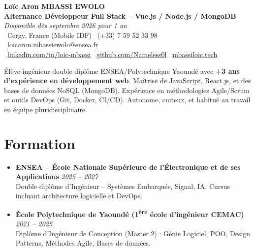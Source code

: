 \documentclass[a4paper,11pt]{article}
\begin{document}
\begin{center}
    {\Large \textbf{Loïc Aron MBASSI EWOLO}} \\ \vspace{4pt}
    \textbf{\large Alternance Développeur Full Stack -- Vue.js / Node.js / MongoDB} \\
    \textit{\small Disponible dès septembre 2026 pour 1 an} \\ \vspace{4pt}
    \small
    \faMapMarker\ Cergy, France (Mobile IDF) \quad
    \faPhone\ (+33) 7 59 52 33 98 \quad
    \faEnvelope\ \href{mailto:loicaron.mbassiewolo@ensea.fr}{loicaron.mbassiewolo@ensea.fr} \\ \vspace{2pt}
    \faLinkedin\ \href{https://www.linkedin.com/in/loic-mbassi/}{linkedin.com/in/loic-mbassi} \quad
    \faGithub\ \href{https://github.com/Nameless0l}{github.com/Nameless0l} \quad
    \faGlobe\ \href{https://mbassiloic.tech}{mbassiloic.tech}
\end{center}

\vspace{-6pt}

\noindent\small{Élève-ingénieur double diplôme ENSEA/Polytechnique Yaoundé avec \textbf{+3 ans d'expérience en développement web}. Maîtrise de JavaScript, React.js, et des bases de données NoSQL (MongoDB). Expérience en méthodologies Agile/Scrum et outils DevOps (Git, Docker, CI/CD). Autonome, curieux, et habitué au travail en équipe pluridisciplinaire.}

\section{Formation}
\begin{itemize}[leftmargin=*, label=\tiny$\bullet$, nosep]
    \item \textbf{ENSEA -- École Nationale Supérieure de l'Électronique et de ses Applications} \hfill \textit{2025 -- 2027} \\
    \small{Double diplôme d'Ingénieur -- Systèmes Embarqués, Signal, IA. Cursus incluant architecture logicielle et DevOps.}
    \item \textbf{École Polytechnique de Yaoundé (1\textsuperscript{ère} école d'ingénieur CEMAC)} \hfill \textit{2021 -- 2025} \\
    \small{Diplôme d'Ingénieur de Conception (Master 2) : Génie Logiciel, POO, Design Patterns, Méthodes Agile, Bases de données.}
\end{itemize}
\end{document}
